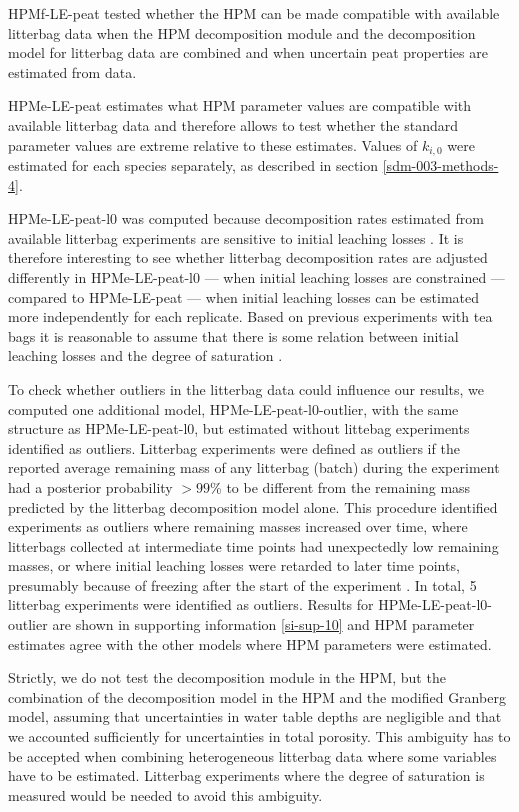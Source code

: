 \documentclass[esd, manuscript]{copernicus}
\begin{document}
HPMf-LE-peat tested whether the HPM can be made compatible with available litterbag data when the HPM decomposition module and the decomposition model for litterbag data are combined and when uncertain peat properties are estimated from data.

HPMe-LE-peat estimates what HPM parameter values are compatible with available litterbag data and therefore allows to test whether the standard parameter values are extreme relative to these estimates. Values of \(k_{i,0}\) were estimated for each species separately, as described in section \ref{sdm-003-methods-4}.

HPMe-LE-peat-l0 was computed because decomposition rates estimated from available litterbag experiments are sensitive to initial leaching losses \citep{Yu.2001, Lind.2022, Teickner.2024f}. It is therefore interesting to see whether litterbag decomposition rates are adjusted differently in HPMe-LE-peat-l0 --- when initial leaching losses are constrained --- compared to HPMe-LE-peat --- when initial leaching losses can be estimated more independently for each replicate. Based on previous experiments with tea bags it is reasonable to assume that there is some relation between initial leaching losses and the degree of saturation \citep{Lind.2022}.

To check whether outliers in the litterbag data could influence our results, we computed one additional model, HPMe-LE-peat-l0-outlier, with the same structure as HPMe-LE-peat-l0, but estimated without littebag experiments identified as outliers. Litterbag experiments were defined as outliers if the reported average remaining mass of any litterbag (batch) during the experiment had a posterior probability \(>99\)\% to be different from the remaining mass predicted by the litterbag decomposition model alone. This procedure identified experiments as outliers where remaining masses increased over time, where litterbags collected at intermediate time points had unexpectedly low remaining masses, or where initial leaching losses were retarded to later time points, presumably because of freezing after the start of the experiment \citep{Teickner.2024f}. In total, 5 litterbag experiments were identified as outliers. Results for HPMe-LE-peat-l0-outlier are shown in supporting information \ref{si-sup-10} and HPM parameter estimates agree with the other models where HPM parameters were estimated.

Strictly, we do not test the decomposition module in the HPM, but the combination of the decomposition model in the HPM and the modified Granberg model, assuming that uncertainties in water table depths are negligible and that we accounted sufficiently for uncertainties in total porosity. This ambiguity has to be accepted when combining heterogeneous litterbag data where some variables have to be estimated. Litterbag experiments where the degree of saturation is measured would be needed to avoid this ambiguity.
\end{document}
